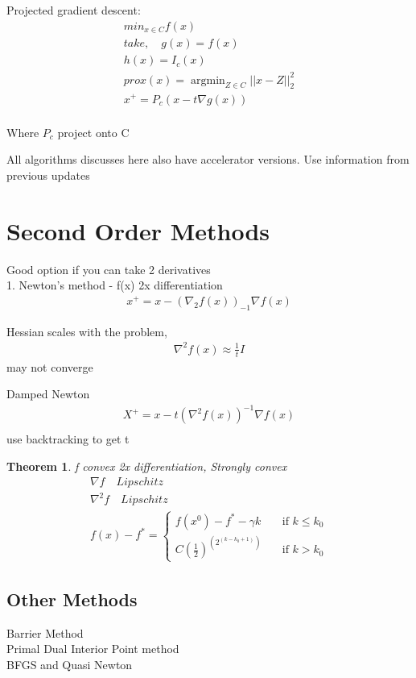 \documentclass[10pt]{article}
\newcounter{lecnum}
\newtheorem{theorem}{Theorem}[lecnum]
\DeclareMathOperator*{\argmin}{argmin}
\begin{document}
Projected gradient descent: \\
\begin{equation}
\begin{aligned}
	min_{x \in C} f(x) \\
	take,\quad g(x) = f(x) \\
			   h(x) = I_c(x) \\
	prox(x) = \argmin_{Z \in C}||x - Z||_2^2 \\
	x^{+} = P_c(x - t\nabla g(x)) \\
\end{aligned}
\end{equation}

Where $P_c$ project onto C

All algorithms discusses here also have accelerator versions. Use information from previous updates


\section{Second Order Methods}
Good option if you can take 2 derivatives \\
1. Newton's method - f(x) 2x differentiation
\begin{equation}
\begin{aligned}
	x^{+} = x - (\nabla_2 f(x))_{-1}\nabla f(x)
\end{aligned}
\end{equation}

Hessian scales with the problem,
\begin{equation}
\begin{aligned}
	\nabla^2 f(x) \approx \frac{1}{t} I
\end{aligned}
\end{equation}
may not converge

Damped Newton
\begin{equation}
\begin{aligned}
	X^{+} = x - t(\nabla^2 f(x))^{-1} \nabla f(x) \\
\end{aligned}
\end{equation}
use backtracking to get t

\begin{theorem}
f convex 2x differentiation, Strongly convex
\begin{equation}
\begin{aligned}
	\nabla f \quad Lipschitz \\
	\nabla^2 f \quad Lipschitz \\
	f(x) - f^*=
  \begin{cases}
    f(x^0) - f^* - \gamma k       & \quad \text{if } k \leq k_0\\
    C(\frac{1}{2})^(2^(k - k_0 + 1))  & \quad \text{if } k > k_0
  \end{cases}
\end{aligned}
\end{equation}
\end{theorem}

\subsection{Other Methods}
Barrier Method \\
Primal Dual Interior Point method \\
BFGS and Quasi Newton \\





\end{document}
